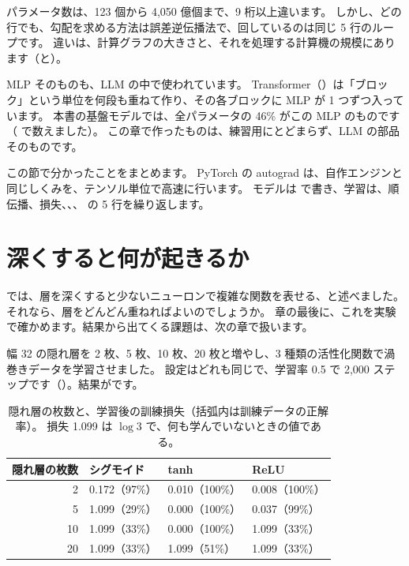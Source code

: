 パラメータ数は、123 個から 4,050 億個まで、9 桁以上違います。
しかし、どの行でも、勾配を求める方法は誤差逆伝播法で、回しているのは同じ 5 行のループです。
違いは、計算グラフの大きさと、それを処理する計算機の規模にあります（と）。

MLP そのものも、LLM の中で使われています。
Transformer（）は「ブロック」という単位を何段も重ねて作り、その各ブロックに MLP が 1 つずつ入っています。
本書の基盤モデルでは、全パラメータの 46\% がこの MLP のものです（ で数えました）。
この章で作ったものは、練習用にとどまらず、LLM の部品そのものです。

この節で分かったことをまとめます。
PyTorch の autograd は、自作エンジンと同じしくみを、テンソル単位で高速に行います。
モデルは  で書き、学習は、順伝播、損失、、、 の 5 行を繰り返します。

\section{深くすると何が起きるか}\label{sec:nn-deep}

では、層を深くすると少ないニューロンで複雑な関数を表せる、と述べました。
それなら、層をどんどん重ねればよいのでしょうか。
章の最後に、これを実験で確かめます。結果から出てくる課題は、次の章で扱います。

幅 32 の隠れ層を 2 枚、5 枚、10 枚、20 枚と増やし、3 種類の活性化関数で渦巻きデータを学習させました。
設定はどれも同じで、学習率 0.5 で 2,000 ステップです（）。結果がです。

\suppressfloats[t]
\begin{table}[tbp]
\centering
\caption{隠れ層の枚数と、学習後の訓練損失（括弧内は訓練データの正解率）。
損失 1.099 は $\log 3$ で、何も学んでいないときの値である。}
\label{tab:nn-depth}
\small
\begin{tabular}{rlll}
\toprule
隠れ層の枚数 & シグモイド & tanh & ReLU \\
\midrule
2 & 0.172（97\%） & 0.010（100\%） & 0.008（100\%） \\
5 & 1.099（29\%） & 0.000（100\%） & 0.037（99\%） \\
10 & 1.099（33\%） & 0.000（100\%） & 1.099（33\%） \\
20 & 1.099（33\%） & 1.099（51\%） & 1.099（33\%） \\
\bottomrule
\end{tabular}
\end{table}

